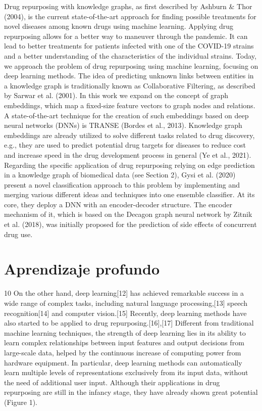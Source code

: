 Drug repurposing with knowledge graphs, as first described
by Ashburn & Thor (2004), is the current state-of-the-art
approach for finding possible treatments for novel diseases
among known drugs using machine learning. Applying drug
repurposing allows for a better way to maneuver through
the pandemic. It can lead to better treatments for patients
infected with one of the COVID-19 strains and a better understanding of the characteristics of the individual strains.
Today, we approach the problem of drug repurposing using machine learning, focusing on deep learning methods.
The idea of predicting unknown links between entities in
a knowledge graph is traditionally known as Collaborative Filtering, as described by Sarwar et al. (2001). In
this work we expand on the concept of graph embeddings,
which map a fixed-size feature vectors to graph nodes and
relations. A state-of-the-art technique for the creation of
such embeddings based on deep neural networks (DNNs) is
TRANSE (Bordes et al., 2013).
Knowledge graph embeddings are already utilized to solve
different tasks related to drug discovery, e.g., they are used
to predict potential drug targets for diseases to reduce cost
and increase speed in the drug development process in general (Ye et al., 2021). Regarding the specific application of
drug repurposing relying on edge prediction in a knowledge
graph of biomedical data (see Section 2), Gysi et al. (2020)
present a novel classification approach to this problem by
implementing and merging various different ideas and techniques into one ensemble classifier. At its core, they deploy
a DNN with an encoder-decoder structure. The encoder
mechanism of it, which is based on the Decagon graph neural network by Zitnik et al. (2018), was initially proposed
for the prediction of side effects of concurrent drug use.

\section{Aprendizaje profundo}

10
On the
other hand, deep learning[12] has achieved remarkable success in a wide range of complex tasks,
including natural language processing,[13] speech recognition[14] and computer vision.[15] Recently,
deep learning methods have also started to be applied to drug repurposing.[16],[17] Different from
traditional machine learning techniques, the strength of deep learning lies in its ability to learn
complex relationships between input features and output decisions from large-scale data, helped by
the continuous increase of computing power from hardware equipment. In particular, deep learning
methods can automatically learn multiple levels of representations exclusively from its input data,
without the need of additional user input. Although their applications in drug repurposing are still in the
infancy stage, they have already shown great potential (Figure 1).
